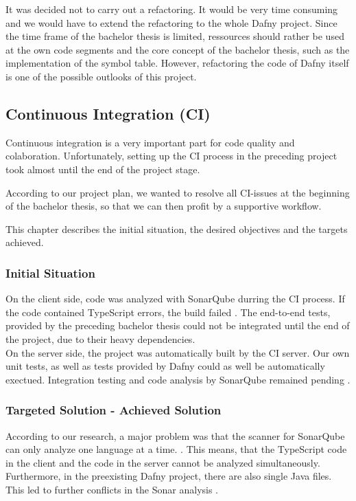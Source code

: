 It was decided not to carry out a refactoring. It would be very time consuming and we would have to extend the refactoring to the whole Dafny project. Since the time frame of the bachelor thesis is limited, ressources should rather be used at the own code segments and the core concept of the bachelor thesis, such as the implementation of the symbol table. However, refactoring the code of Dafny itself is one of the possible outlooks of this project.






\subsection{Continuous Integration (CI)}
Continuous integration is a very important part for code quality and colaboration.
Unfortunately, setting up the CI process in the preceding project\cite{sa} took almost until the end of the project stage.

According to our project plan, we wanted to resolve all CI-issues at the beginning of the bachelor thesis, so that we can then profit by a supportive workflow.

This chapter describes the initial situation, the desired objectives and the targets achieved.

\subsubsection{Initial Situation}
On the client side, code was analyzed with SonarQube durring the CI process. If the code contained TypeScript errors, the build failed \cite{sa}. The end-to-end tests, provided by the preceding bachelor thesis\cite{ba} could not be integrated until the end of the project, due to their heavy dependencies.\\

On the server side, the project was automatically built by the CI server. Our own unit tests, as well as tests provided by Dafny could as well be automatically exectued. Integration testing and code analysis by SonarQube remained pending \cite{sa}.

\subsubsection{Targeted Solution - Achieved Solution}
According to our research, a major problem was that the scanner for SonarQube can only analyze one language at a time. \cite{sonar-supports-only-one-language}. This means, that the TypeScript code in the client and the \Csharp code in the server cannot be analyzed simultaneously.
Furthermore, in the preexisting Dafny project, there are also single Java files. This led to further conflicts in the Sonar analysis \cite{sa}. \\

